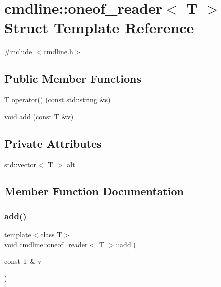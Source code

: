 \hypertarget{structcmdline_1_1oneof__reader}{}\section{cmdline\+::oneof\+\_\+reader$<$ T $>$ Struct Template Reference}
\label{structcmdline_1_1oneof__reader}


{\ttfamily \#include $<$cmdline.\+h$>$}

\subsection*{Public Member Functions}
\begin{DoxyCompactItemize}
\item 
T \mbox{\hyperlink{structcmdline_1_1oneof__reader_a08342ad57fe7eae76ccdbe6af6cc572f}{operator()}} (const std\+::string \&s)
\item 
void \mbox{\hyperlink{structcmdline_1_1oneof__reader_af1101d86b057fae4f0dbc5bef1fb7d8c}{add}} (const T \&v)
\end{DoxyCompactItemize}
\subsection*{Private Attributes}
\begin{DoxyCompactItemize}
\item 
std\+::vector$<$ T $>$ \mbox{\hyperlink{structcmdline_1_1oneof__reader_a78106c3bc54537d6ae591d0b04eab7a5}{alt}}
\end{DoxyCompactItemize}


\subsection{Member Function Documentation}
\mbox{\label{structcmdline_1_1oneof__reader_af1101d86b057fae4f0dbc5bef1fb7d8c}} 
\subsubsection{\texorpdfstring{add()}{add()}}
{\footnotesize\ttfamily template$<$class T$>$ \\
void \mbox{\hyperlink{structcmdline_1_1oneof__reader}{cmdline\+::oneof\+\_\+reader}}$<$ T $>$\+::add (\begin{DoxyParamCaption}\item[{const T \&}]{v }\end{DoxyParamCaption})\hspace{0.3cm}{\ttfamily [inline]}}

